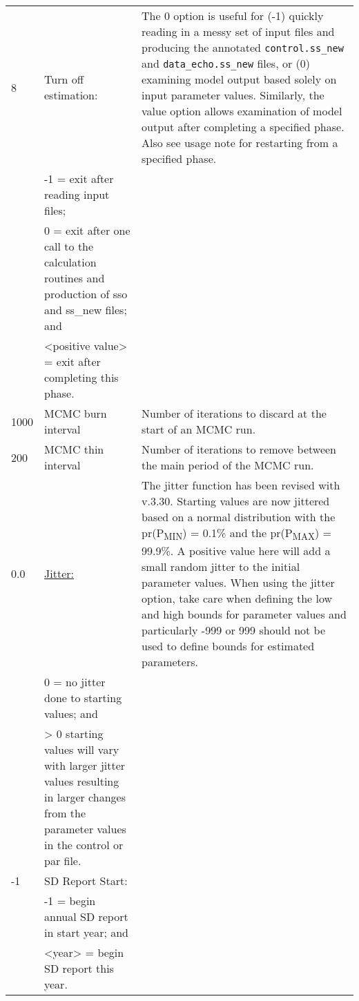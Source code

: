 {\begin{landscape}
\begin{longtable}{p{1.5cm} p{7.2cm} p{12.3cm}}
 \hline
 8 & Turn off estimation: &  \multirow{1}{1cm}[-0.25cm]{\parbox{12.5cm}{The 0 option is useful for (-1) quickly reading in a messy set of input files and producing the annotated \texttt{control.ss\_new} and \texttt{data\_echo.ss\_new} files, or (0) examining model output based solely on input parameter values. Similarly, the value option allows examination of model output after completing a specified phase. Also see usage note for restarting from a specified phase.}} \Tstrut\\
   & -1 = exit after reading input files; & \\
   & 0 = exit after one call to the calculation routines and production of sso and ss\_new files; and & \\
   & <positive value> = exit after completing this phase. & \Bstrut\\	  
	     
 \hline
 1000 & MCMC burn interval & Number of iterations to discard at the start of an MCMC run. \Tstrut\Bstrut\\
	   
 \hline
 200 & MCMC thin interval & Number of iterations to remove between the main period of the MCMC run. \Tstrut\\
	
 \hline 
 0.0 & \hyperlink{Jitter}{Jitter:} & \multirow{1}{1cm}[-0.25cm]{\parbox{12.5cm}{The jitter function has been revised with v.3.30. Starting values are now jittered based on a normal distribution with the pr(P\textsubscript{MIN}) = 0.1\% and the pr(P\textsubscript{MAX}) = 99.9\%. A positive value here will add a small random jitter to the initial parameter values. When using the jitter option, take care when defining the low and high bounds for parameter values and particularly -999 or 999 should not be used to define bounds for estimated parameters.}} \Tstrut\Bstrut\\ 
	 & 0 = no jitter done to starting values; and & \Bstrut\\
	 & > 0 starting values will vary with larger jitter values resulting in larger changes from the parameter values in the control or par file. & \Bstrut\\
	
 \hline
 -1 & SD Report Start: & \Tstrut\\
    & -1 = begin annual SD report in start year; and & \\
    & <year> = begin SD report this year. & \Bstrut\\
	      

\end{longtable}
\end{landscape}}
